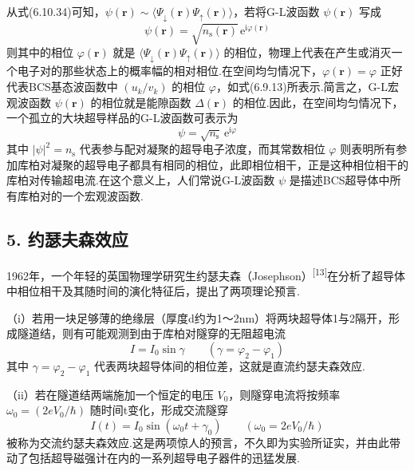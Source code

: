 从式(6.10.34)可知，$\psi(\boldsymbol{r})\sim
\langle\Psi_{\downarrow}(\boldsymbol{r})\Psi_{\uparrow}(\boldsymbol{r})\rangle$，若将G-L波函数 $\psi(\boldsymbol{r})$ 写成
\begin{equation}
  \psi(\boldsymbol{r})=\sqrt{n_{\mathrm{s}}(\boldsymbol{r})}\,
  \mathrm{e}^{\mathrm{i}\varphi(\boldsymbol{r})}
\end{equation}
则其中的相位 $\varphi(\boldsymbol{r})$ 就是
$\langle\Psi_{\downarrow}(\boldsymbol{r})\Psi_{\uparrow}(\boldsymbol{r})\rangle$
的相位，物理上代表在产生或消灭一个电子对的那些状态上的概率幅的相对相位.在空间均匀情况下，$\varphi(\boldsymbol{r})=\varphi$ 正好代表BCS基态波函数中 $\left(u_{k}/v_{k}\right)$ 的相位 $\varphi$，如式(6.9.13)所表示.简言之，G-L宏观波函数 $\psi(\boldsymbol{r})$ 的相位就是能隙函数 $\Delta(\boldsymbol{r})$ 的相位.因此，在空间均匀情况下，一个孤立的大块超导样品的G-L波函数可表示为
\begin{equation}
  \psi=\sqrt{n_{\mathrm{s}}}\,\mathrm{e}^{\mathrm{i}\varphi}
\end{equation}
其中 $|\psi|^{2}=n_{\mathrm{s}}$ 代表参与配对凝聚的超导电子浓度，而其常数相位 $\varphi$ 则表明所有参加库柏对凝聚的超导电子都具有相同的相位，此即相位相干，正是这种相位相干的库柏对传输超电流.在这个意义上，人们常说G-L波函数 $\psi$ 是描述BCS超导体中所有库柏对的一个宏观波函数.

\subsection*{5. 约瑟夫森效应}

1962年，一个年轻的英国物理学研究生约瑟夫森（Josephson）\textsuperscript{[13]}在分析了超导体中相位相干及其随时间的演化特征后，提出了两项理论预言.

（i）若用一块足够薄的绝缘层（厚度d约为1～2nm）将两块超导体1与2隔开，形成隧道结，则有可能观测到由于库柏对隧穿的无阻超电流
\begin{equation}
  I=I_{0}\sin\gamma
  \qquad\left(\gamma=\varphi_{2}-\varphi_{1}\right)
\end{equation}
其中 $\gamma=\varphi_{2}-\varphi_{1}$ 代表两块超导体间的相位差，这就是直流约瑟夫森效应.

（ii）若在隧道结两端施加一个恒定的电压 $V_{0}$，则隧穿电流将按频率 $\omega_{0}=\left(2eV_{0}/\hbar\right)$ 随时间t变化，形成交流隧穿
\begin{equation}
  I(t)=I_{0}\sin\left(\omega_{0}t+\gamma_{0}\right)
  \qquad\left(\omega_{0}=2eV_{0}/\hbar\right)
\end{equation}
被称为交流约瑟夫森效应.这是两项惊人的预言，不久即为实验所证实，并由此带动了包括超导磁强计在内的一系列超导电子器件的迅猛发展.

